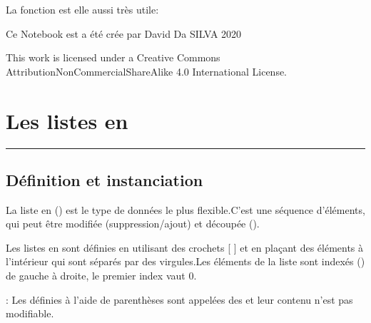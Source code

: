 \documentclass[letterpaper,10pt,english]{sphinxmanual}
\begin{document}
\begin{sphinxVerbatim}[commandchars=\\\{\}]
\end{sphinxVerbatim}

La fonction  est elle aussi très utile:

\begin{sphinxVerbatim}[commandchars=\\\{\}]
\end{sphinxVerbatim}

Ce Notebook est a été crée par David Da SILVA \sphinxhyphen{} 2020

This work is licensed under a Creative Commons Attribution\sphinxhyphen{}NonCommercial\sphinxhyphen{}ShareAlike 4.0 International License.


\chapter{Les listes en }
\label{\detokenize{src/OCI02_Listes:les-listes-en-python}}\label{\detokenize{src/OCI02_Listes::doc}}

\bigskip\hrule\bigskip



\section{Définition et instanciation}
\label{\detokenize{src/OCI02_Listes:definition-et-instanciation}}
La liste en  () est le type de données le plus flexible.C’est une séquence d’éléments, qui peut être modifiée (suppression/ajout) et découpée ().

Les listes en  sont définies en utilisant des crochets {[} {]} et en plaçant des éléments à l’intérieur qui sont séparés par des virgules.Les éléments de la liste sont indexés () de gauche à droite, le premier index vaut 0.

 : Les  définies à l’aide de parenthèses sont appelées des  et leur contenu n’est pas modifiable.

\begin{sphinxVerbatim}[commandchars=\\\{\}]
  \PYG{p}{[}\PYG{p}{]}
\end{sphinxVerbatim}
\end{document}
